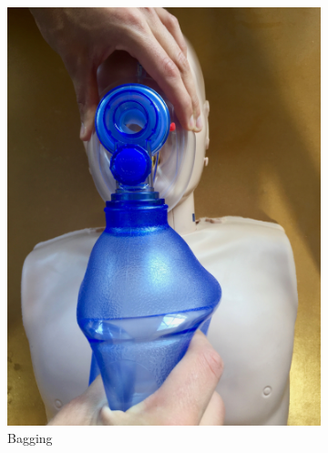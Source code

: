 \begin{figure}[b]
\begin{subfigure}[b]{0.18\textwidth}
		\includegraphics[width=\textwidth]{pictures/bagging}
		\caption{Bagging}
		\label{fig:bagging}
	\end{subfigure}
	~ %
	\begin{subfigure}[b]{0.18\textwidth}

\end{subfigure}
\end{figure}
